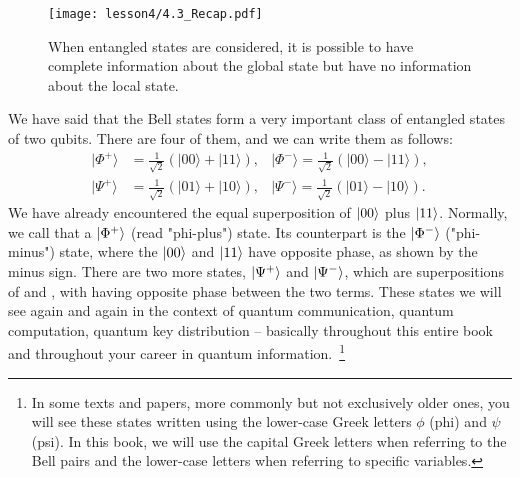 \begin{figure}[H]
    \centering
    \texttt{[image: lesson4/4.3\_Recap.pdf]}
        \caption[Complete global but no local information]{When entangled states are considered, it is possible to have complete information about the global state but have no information about the local state.}
    \label{fig:incomplete-information}
\end{figure}


We have said that the Bell states form a very important class of entangled states of two qubits. There are four of them, and we can write them as follows: 
\begin{equation}
    \begin{aligned}
        |\Phi^+\rangle & = \frac{1}{\sqrt{2}} \left( |00\rangle + |11\rangle \right), & 
        |\Phi^-\rangle = \frac{1}{\sqrt2} \left( |00\rangle - |11\rangle \right), \\
        |\Psi^+\rangle & = \frac{1}{\sqrt{2}} \left( |01\rangle + |10\rangle \right), & 
        |\Psi^-\rangle = \frac{1}{\sqrt2} \left(|01\rangle - |10\rangle \right).
    \end{aligned}
\end{equation}
We have already encountered the equal superposition of $\left| 00 \right\rangle$ plus $\left| 11 \right\rangle$. Normally, we call that a $\left| \Phi^+ \right\rangle$ (read "phi-plus") state. Its counterpart is the $\left| \Phi^- \right\rangle$ ("phi-minus") state, where the $\left| 00 \right\rangle$ and $\left| 11 \right\rangle$ have opposite phase, as shown by the minus sign. There are two more states, $\left| \Psi^+ \right\rangle$ and $\left| \Psi^- \right\rangle$, which are superpositions of  and , with \ket{\Psi^-} having opposite phase between the two terms.  These states we will see again and again in the context of quantum communication, quantum computation, quantum key distribution -- basically throughout this entire book and throughout your career in quantum information.~\footnote{In some texts and papers, more commonly but not exclusively older ones, you will see these states written using the lower-case Greek letters $\phi$ (phi) and $\psi$ (psi).  In this book, we will use the capital Greek letters when referring to the Bell pairs and the lower-case letters when referring to specific variables.} 

